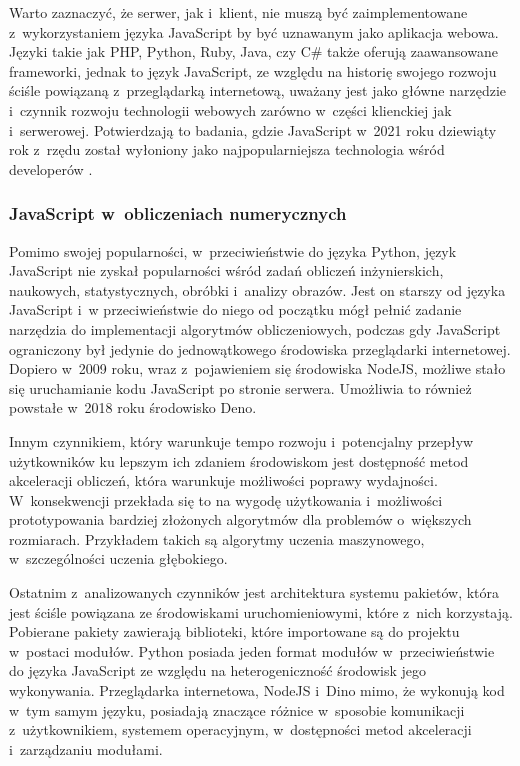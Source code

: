 Warto zaznaczyć, że serwer, jak i~klient, nie muszą być zaimplementowane z~wykorzystaniem języka JavaScript by być uznawanym jako aplikacja webowa. Języki takie jak PHP, Python, Ruby, Java, czy C\# także oferują zaawansowane frameworki, jednak to język JavaScript, ze względu na historię swojego rozwoju ściśle powiązaną z~przeglądarką internetową, uważany jest jako główne narzędzie i~czynnik rozwoju technologii webowych zarówno w~części klienckiej jak i~serwerowej. Potwierdzają to badania, gdzie JavaScript w~2021 roku dziewiąty rok z~rzędu został wyłoniony jako najpopularniejsza technologia wśród developerów \cite{stack2021}.



\subsubsection{JavaScript w~obliczeniach numerycznych}

Pomimo swojej popularności, w~przeciwieństwie do języka Python, język JavaScript nie zyskał popularności wśród zadań obliczeń inżynierskich, naukowych, statystycznych, obróbki i~analizy obrazów. Jest on starszy od języka JavaScript i~w przeciwieństwie do niego od początku mógł pełnić zadanie narzędzia do implementacji algorytmów obliczeniowych, podczas gdy JavaScript ograniczony był jedynie do jednowątkowego środowiska przeglądarki internetowej. Dopiero w~2009 roku, wraz z~pojawieniem się środowiska NodeJS, możliwe stało się uruchamianie kodu JavaScript po stronie serwera. Umożliwia to również powstałe w~2018 roku środowisko Deno. 

Innym czynnikiem, który warunkuje tempo rozwoju i~potencjalny przepływ użytkowników ku lepszym ich zdaniem środowiskom jest dostępność metod akceleracji obliczeń, która warunkuje możliwości poprawy wydajności. W~konsekwencji przekłada się to na wygodę użytkowania i~możliwości prototypowania bardziej złożonych algorytmów dla problemów o~większych rozmiarach. Przykładem takich są algorytmy uczenia maszynowego, w~szczególności uczenia głębokiego.

Ostatnim z~analizowanych czynników jest architektura systemu pakietów, która jest ściśle powiązana ze środowiskami uruchomieniowymi, które z~nich korzystają. Pobierane pakiety zawierają biblioteki, które importowane są do projektu w~postaci modułów. Python posiada jeden format modułów w~przeciwieństwie do języka JavaScript ze względu na heterogeniczność środowisk jego wykonywania. Przeglądarka internetowa, NodeJS i~Dino mimo, że wykonują kod w~tym samym języku, posiadają znaczące różnice w~sposobie komunikacji z~użytkownikiem, systemem operacyjnym, w~dostępności metod akceleracji i~zarządzaniu modułami.

